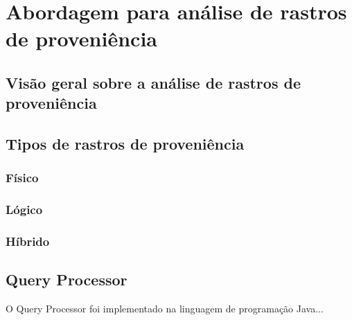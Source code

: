 
\chapter{Abordagem para análise de rastros de proveniência}%
\label{chap:rastros-de-proveniencia}


\section{Visão geral sobre a análise de rastros de proveniência}

 
\section{Tipos de rastros de proveniência}


\subsection{Físico}

\subsection{Lógico}

\subsection{Híbrido}


\section{Query Processor}

O Query Processor foi implementado na linguagem de programação Java...


